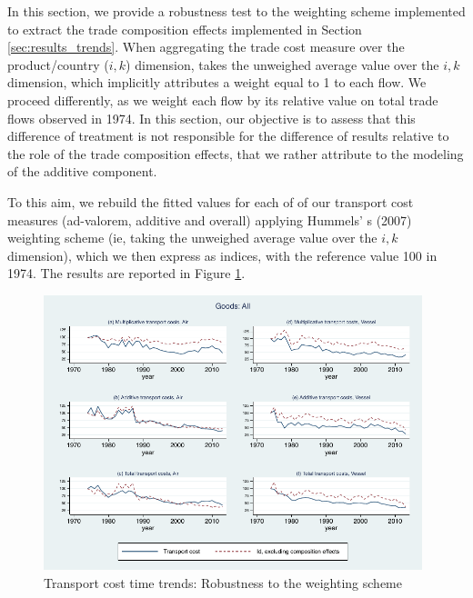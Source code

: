 \documentclass[a4paper,11pt]{article}
\begin{document}
In this section, we provide a robustness test to the weighting scheme implemented to extract the trade composition effects implemented in Section \ref{sec:results_trends}. When aggregating the trade cost measure over the product/country ($i,k$) dimension, \cite{hummels2007} takes the unweighed average value over the $i,k$ dimension, which implicitly attributes a weight equal to 1 to each flow. We proceed differently, as we weight each flow by its relative value on total trade flows observed in 1974. In this section, our objective is to assess that this difference of treatment is not responsible for the difference of results relative to the role of the trade composition effects, that we rather attribute to the modeling of the additive component.

To this aim, we rebuild the fitted values for each of of our transport cost measures (ad-valorem, additive and overall) applying Hummels' s (2007) weighting scheme (ie, taking the unweighed average value over the $i,k$ dimension), which we then express as indices, with the reference value 100 in 1974. The results are reported in Figure \ref{fig:compeffects_robustness}.

\begin{figure}[htbp]
\caption{Transport cost time trends: Robustness to the weighting scheme}
\label{fig:compeffects_robustness}
\begin{center}
\includegraphics[height=8cm]
{graph_composition_all_np.pdf}
\end{center}
\end{figure}
\end{document}
